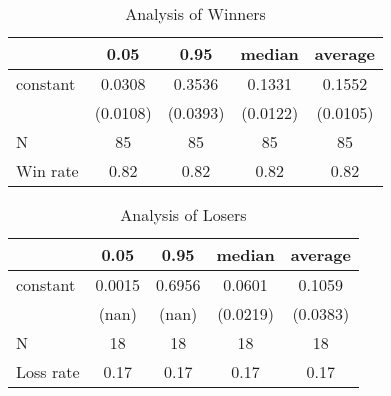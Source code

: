 \documentclass{article}
\begin{document}
\begin{table}
\caption{Analysis of Winners}
\begin{center}
\begin{tabular}{lcccc}
\hline
         &   0.05   &   0.95   &  median  & average   \\
\midrule
\midrule
constant & 0.0308   & 0.3536   & 0.1331   & 0.1552    \\
         & (0.0108) & (0.0393) & (0.0122) & (0.0105)  \\
N        & 85       & 85       & 85       & 85        \\
Win rate & 0.82     & 0.82     & 0.82     & 0.82      \\
\hline
\end{tabular}
\end{center}
\end{table}

\begin{table}
\caption{Analysis of Losers}
\begin{center}
\begin{tabular}{lcccc}
\hline
          &  0.05  &  0.95  &  median  & average   \\
\midrule
\midrule
constant  & 0.0015 & 0.6956 & 0.0601   & 0.1059    \\
          & (nan)  & (nan)  & (0.0219) & (0.0383)  \\
N         & 18     & 18     & 18       & 18        \\
Loss rate & 0.17   & 0.17   & 0.17     & 0.17      \\
\hline
\end{tabular}
\end{center}
\end{table}
\end{document}
